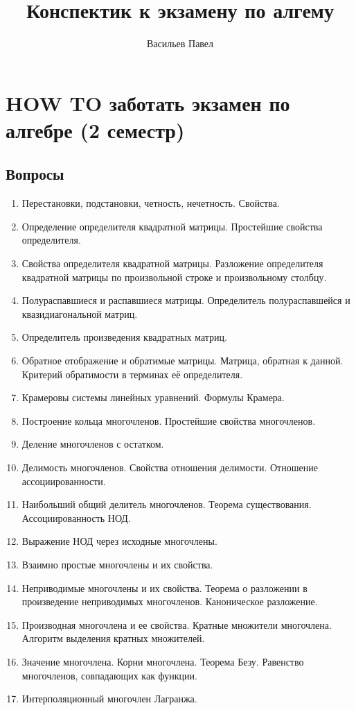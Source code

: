 \documentclass[a4paper]{article}
\title{Конспектик к экзамену по алгему}
\author{Васильев Павел}
\begin{document}
\section*{HOW TO заботать экзамен по алгебре (2 семестр)}

\subsection*{Вопросы}

\begin{enumerate}
\item Перестановки, подстановки, четность, нечетность. Свойства. 
\item Определение определителя квадратной матрицы. Простейшие свойства определителя. 
\item Свойства определителя квадратной матрицы. Разложение определителя квадратной матрицы по произвольной строке и произвольному столбцу.
\item Полураспавшиеся и распавшиеся матрицы. Определитель полураспавшейся и квазидиагональной матриц.
\item Определитель произведения квадратных матриц.
\item Обратное отображение и обратимые матрицы. Матрица, обратная к данной. Критерий обратимости в терминах её определителя.
\item Крамеровы системы линейных уравнений. Формулы Крамера.
\item Построение кольца многочленов. Простейшие свойства многочленов.
\item Деление многочленов с остатком.
\item Делимость многочленов. Свойства отношения делимости. Отношение ассоциированности.
\item Наибольший общий делитель многочленов. Теорема существования. Ассоциированность НОД. 
\item Выражение НОД через исходные многочлены.
\item Взаимно простые многочлены и их свойства.
\item Неприводимые многочлены и их свойства. Теорема о разложении в произведение неприводимых многочленов. Каноническое разложение.
\item Производная многочлена и ее свойства. Кратные множители многочлена. Алгоритм выделения кратных множителей.
\item Значение многочлена. Корни многочлена. Теорема Безу. Равенство многочленов, совпадающих как функции.
\item Интерполяционный многочлен Лагранжа.

\end{enumerate}
\end{document}
